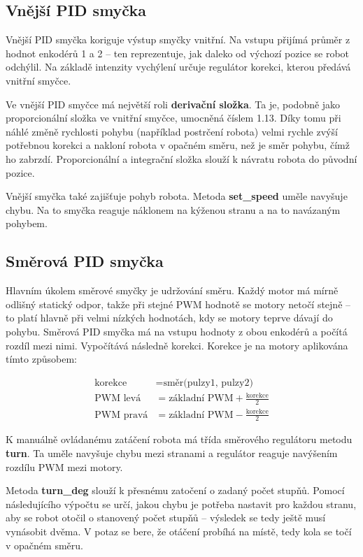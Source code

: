 \subsection*{Vnější PID smyčka}
Vnější PID smyčka koriguje výstup smyčky vnitřní. Na vstupu přijímá průměr z hodnot enkodérů 1 a 2 -- ten reprezentuje, jak daleko od výchozí pozice se robot odchýlil. Na základě intenzity vychýlení určuje regulátor korekci, kterou předává vnitřní smyčce.

Ve vnější PID smyčce má největší roli \textbf{derivační složka}. Ta je, podobně jako proporcionální složka ve vnitřní smyčce, umocněná číslem 1.13. Díky tomu při náhlé změně rychlosti pohybu (například postrčení robota) velmi rychle zvýší potřebnou korekci a nakloní robota v opačném směru, než je směr pohybu, čímž ho zabrzdí. Proporcionální a integrační složka slouží k návratu robota do původní pozice. 

Vnější smyčka také zajišťuje pohyb robota. Metoda \textbf{set\_speed} uměle navyšuje chybu. Na to smyčka reaguje náklonem na kýženou stranu a na to navázaným pohybem.

\subsection*{Směrová PID smyčka}
\label{turn}
Hlavním úkolem směrové smyčky je udržování směru. Každý motor má mírně odlišný statický odpor, takže při stejné PWM hodnotě se motory netočí stejně -- to platí hlavně při velmi nízkých hodnotách, kdy se motory teprve dávají do pohybu. Směrová PID smyčka má na vstupu hodnoty z obou enkodérů a počítá rozdíl mezi nimi. Vypočítává následně korekci. Korekce je na motory aplikována tímto způsobem:

\begin{align*}
\text{korekce} &= \text{směr(pulzy1, pulzy2)} \\
\text{PWM levá} &= \text{základní PWM} + \frac{\text{korekce}}{2} \\
\text{PWM pravá} &= \text{základní PWM} - \frac{\text{korekce}}{2}
\end{align*}

K manuálně ovládanému zatáčení robota má třída směrového regulátoru metodu \textbf{turn}. Ta uměle navyšuje chybu mezi stranami a regulátor reaguje navýšením rozdílu PWM mezi motory.

Metoda \textbf{turn\_deg} slouží k přesnému zatočení o zadaný počet stupňů. Pomocí následujícího výpočtu se určí, jakou chybu je potřeba nastavit pro každou stranu, aby se robot otočil o stanovený počet stupňů -- výsledek se tedy ještě musí vynásobit dvěma. V potaz se bere, že otáčení probíhá na místě, tedy kola se točí v opačném směru.


